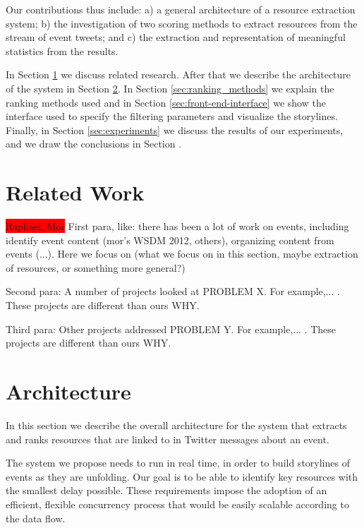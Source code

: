 \documentclass{sig-alternate}
\newcommand{\todo}[1]{\colorbox{red}{#1}}
\begin{document}
Our contributions thus include: a) a general architecture of a resource extraction system; b) the investigation of two scoring methods to extract resources from the stream of event tweets; and c) the extraction and representation of meaningful statistics from the results.

In Section \ref{sec:related-work} we discuss related research. After that we describe the architecture of the system in Section \ref{sec:architecture}. In Section \ref{sec:ranking_methods} we explain the ranking methods used and in Section \ref{sec:front-end-interface} we show the interface used to specify the filtering parameters and visualize the storylines. Finally, in Section \ref{sec:experiments} we discuss the results of our experiments, and we draw the conclusions in Section \label{sec:conclusions}.


\section{Related Work}
\label{sec:related-work}

\todo{Raphael, Mor}
First para, like: there has been a lot of work on events, including identify event content (mor's WSDM 2012, others), organizing content from events (...). Here we focus on (what we focus on in this section, maybe extraction of resources, or something more general?)

Second para: A number of projects looked at PROBLEM X. For example,... . These projects are different than ours WHY.

Third para: Other projects addressed PROBLEM Y. For example,... . These projects are different than ours WHY.



\section{Architecture}
\label{sec:architecture}
In this section we describe the overall architecture for the system that extracts and ranks resources that are linked to in Twitter messages about an event.

The system we propose needs to run in real time, in order to build storylines of events as they are unfolding. Our goal is to be able to identify key resources with the smallest delay possible. These requirements impose the adoption of an efficient, flexible concurrency process that would be easily scalable according to the data flow.
\end{document}
